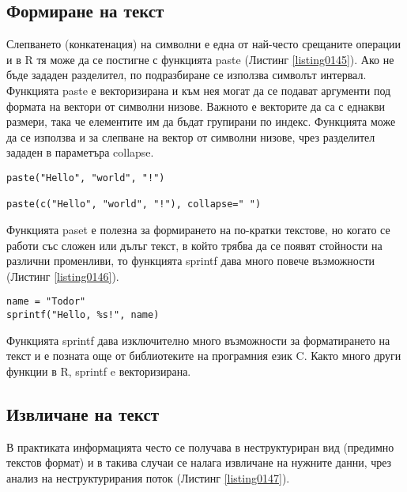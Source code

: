 \subsection{Формиране на текст}

Слепването (конкатенация) на символни е една от най-често срещаните операции и в R тя може да се постигне с функцията paste (Листинг \ref{listing0145}). Ако не бъде зададен разделител, по подразбиране се използва символът интервал. Функцията paste е векторизирана и към нея могат да се подават аргументи под формата на вектори от символни низове. Важното е векторите да са с еднакви размери, така че елементите им да бъдат групирани по индекс. Функцията може да се използва и за слепване на вектор от символни низове, чрез разделител зададен в параметъра collapse. 

\begin{lstlisting}[caption=Конкатенация на символни низове, label=listing0145]
paste("Hello", "world", "!")

paste(c("Hello", "world", "!"), collapse=" ")
\end{lstlisting}

Функцията paset е полезна за формирането на по-кратки текстове, но когато се работи със сложен или дълъг текст, в който трябва да се появят стойности на различни променливи, то функцията sprintf дава много повече възможности (Листинг \ref{listing0146}). 

\begin{lstlisting}[caption=Разпъване от редове в колони, label=listing0146]
name = "Todor"
sprintf("Hello, %s!", name)
\end{lstlisting}

Функцията sprintf дава изключително много възможности за форматирането на текст и е позната още от библиотеките на програмния език C. Както много други функции в R, sprintf e векторизирана. 

\subsection{Извличане на текст}

В практиката информацията често се получава в неструктуриран вид (предимно текстов формат) и в такива случаи се налага извличане на нужните данни, чрез анализ на неструктурирания поток (Листинг \ref{listing0147}). 

